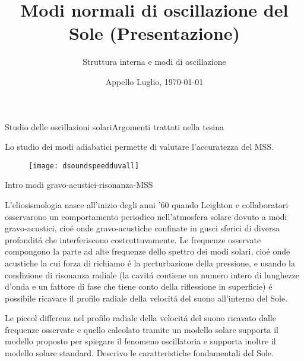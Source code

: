 \documentclass[10pt,xcolor={usenames},fleqn,mathserif,serif]{beamer}
\title{Modi normali di oscillazione del Sole (Presentazione)}
\subtitle{Struttura interna e modi di oscillazione}
\date{Appello Luglio, \today}
\begin{document}
\begin{frame}
  \titlepage
\end{frame}



\begin{frame}[label={intro}]{Studio delle oscillazioni solari}{Argomenti trattati nella tesina}

Lo studio dei modi adiabatici permette di valutare l'accuratezza del MSS.

\begin{figure}[!ht]
\texttt{[image: dsoundspeedduvall]} 

\label{dsoundduvall}
\end{figure}

\end{frame}

\begin{wordonframe}{Intro modi gravo-acustici-risonanza-MSS}

L'eliosismologia nasce all'inizio degli anni '60 quando Leighton e collaboratori osservarono un comportamento periodico nell'atmosfera solare dovuto a modi gravo-acustici, cio\'e onde gravo-acustiche confinate in gusci sferici di diversa profondit\'a che interferiscono costruttuvamente. %
Le frequenze osservate compongono la parte ad alte frequenze dello spettro dei modi solari, cio\'e onde acustiche la cui forza di richiamo \'e la perturbazione della pressione, e usando la condizione di risonanza radiale (la cavit\'a contiene un numero intero di lunghezze d'onda e un fattore di fase che tiene conto della riflessione in superficie) \'e possibile ricavare il profilo radiale della velocit\'a del suono all'interno del Sole.

Le piccol differenz nel profilo radiale della velocit\'a del suono ricavato dalle frequenze osservate e quello calcolato tramite un modello solare supporta il modello proposto per spiegare il fenomeno oscillatoria e supporta inoltre il modello solare standard. Descrivo le caratteristiche fondamentali del Sole.


\end{wordonframe}
\end{document}
